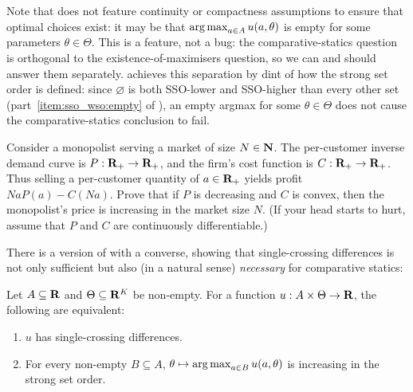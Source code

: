 Note that  does not feature continuity or compactness assumptions to ensure that optimal choices exist: it may be that $\operatorname*{arg\,max}_{a \in A} u(a,\theta)$ is empty for some parameters $\theta \in \Theta$. This is a feature, not a bug: the comparative-statics question is orthogonal to the existence-of-maximisers question, so we can and should answer them separately.  achieves this separation by dint of how the strong set order is defined: since $\varnothing$ is both SSO-lower and SSO-higher than every other set (part~\ref{item:sso_wso:empty} of ), an empty argmax for some $\theta \in \Theta$ does not cause the comparative-statics conclusion to fail.

\begin{exercise}
	\label{exercise:market_size}
	Consider a monopolist serving a market of size $N \in \mathbf{N}$. The per-customer inverse demand curve is $P : \mathbf{R}_+ \to \mathbf{R}_+$, and the firm's cost function is $C : \mathbf{R}_+ \to \mathbf{R}_+$. Thus selling a per-customer quantity of $a \in \mathbf{R}_+$ yields profit $N aP(a) - C(N a)$. Prove that if $P$ is decreasing and $C$ is convex, then the monopolist's price is increasing in the market size $N$. (If your head starts to hurt, assume that $P$ and $C$ are continuously differentiable.)
\end{exercise}

There is a version of  with a converse, showing that single-crossing differences is not only sufficient but also (in a natural sense) \emph{necessary} for comparative statics:

\begin{namedthm}[\Cref*{theorem:topkis_ms}$\boldsymbol{^\star}$.]
	\label{theorem:topkis_ms_converse}
	Let $A \subseteq \mathbf{R}$ and $\Theta \subseteq \mathbf{R}^K$ be non-empty. For a function $u : A \times \Theta \to \mathbf{R}$, the following are equivalent:
	\begin{enumerate}[label=(\alph*)]
	
		\item \label{item:topkis_ms_converse_scd} $u$ has single-crossing differences.

		\item \label{item:topkis_ms_converse_mcs} For every non-empty $B \subseteq A$, $\theta \mapsto \operatorname*{arg\,max}_{a \in B} u(a,\theta)$ is increasing in the strong set order.
	
	\end{enumerate}
\end{namedthm}

